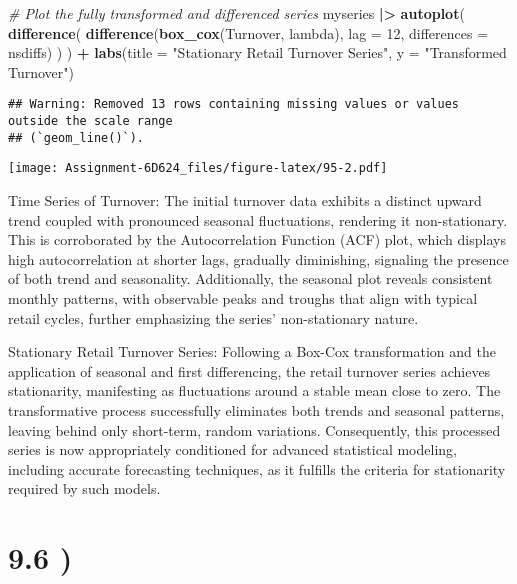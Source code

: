 \documentclass[
]{article}
\newenvironment{Shaded}{\begin{snugshade}}{\end{snugshade}}
\newcommand{\AttributeTok}[1]{\textcolor[rgb]{0.13,0.29,0.53}{#1}}
\newcommand{\CommentTok}[1]{\textcolor[rgb]{0.56,0.35,0.01}{\textit{#1}}}
\newcommand{\DecValTok}[1]{\textcolor[rgb]{0.00,0.00,0.81}{#1}}
\newcommand{\FunctionTok}[1]{\textcolor[rgb]{0.13,0.29,0.53}{\textbf{#1}}}
\newcommand{\NormalTok}[1]{#1}
\newcommand{\SpecialCharTok}[1]{\textcolor[rgb]{0.81,0.36,0.00}{\textbf{#1}}}
\newcommand{\StringTok}[1]{\textcolor[rgb]{0.31,0.60,0.02}{#1}}
\begin{document}
\begin{Shaded}
\begin{Highlighting}[]
\CommentTok{\# Plot the fully transformed and differenced series}
\NormalTok{myseries }\SpecialCharTok{|\textgreater{}} 
  \FunctionTok{autoplot}\NormalTok{(}
    \FunctionTok{difference}\NormalTok{(}
      \FunctionTok{difference}\NormalTok{(}\FunctionTok{box\_cox}\NormalTok{(Turnover, lambda), }\AttributeTok{lag =} \DecValTok{12}\NormalTok{, }\AttributeTok{differences =}\NormalTok{ nsdiffs)}
\NormalTok{    )}
\NormalTok{  ) }\SpecialCharTok{+}
  \FunctionTok{labs}\NormalTok{(}\AttributeTok{title =} \StringTok{"Stationary Retail Turnover Series"}\NormalTok{, }\AttributeTok{y =} \StringTok{"Transformed Turnover"}\NormalTok{)}
\end{Highlighting}
\end{Shaded}

\begin{verbatim}
## Warning: Removed 13 rows containing missing values or values outside the scale range
## (`geom_line()`).
\end{verbatim}

\texttt{[image: Assignment-6D624\_files/figure-latex/95-2.pdf]}

Time Series of Turnover: The initial turnover data exhibits a distinct
upward trend coupled with pronounced seasonal fluctuations, rendering it
non-stationary. This is corroborated by the Autocorrelation Function
(ACF) plot, which displays high autocorrelation at shorter lags,
gradually diminishing, signaling the presence of both trend and
seasonality. Additionally, the seasonal plot reveals consistent monthly
patterns, with observable peaks and troughs that align with typical
retail cycles, further emphasizing the series' non-stationary nature.

Stationary Retail Turnover Series: Following a Box-Cox transformation
and the application of seasonal and first differencing, the retail
turnover series achieves stationarity, manifesting as fluctuations
around a stable mean close to zero. The transformative process
successfully eliminates both trends and seasonal patterns, leaving
behind only short-term, random variations. Consequently, this processed
series is now appropriately conditioned for advanced statistical
modeling, including accurate forecasting techniques, as it fulfills the
criteria for stationarity required by such models.

\section{9.6 )}\label{section-4}
\end{document}

